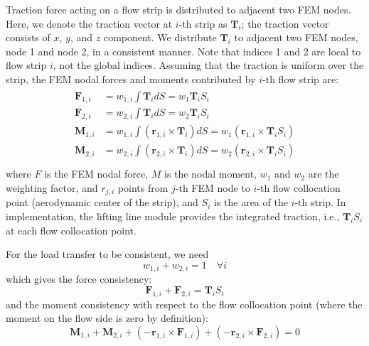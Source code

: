 \documentclass[10pt]{article}
\newcommand{\mb}[1]{\boldsymbol{\mathbf{#1}}} %
\begin{document}
Traction force acting on a flow strip is distributed to adjacent two FEM nodes.
Here, we denote the traction vector at $i$-th strip as $\mb{T}_i$; the traction vector consists of $x$, $y$, and $z$ component.
We distribute $\mb{T}_i$ to adjacent two FEM nodes, node 1 and node 2, in a consistent manner.
Note that indices 1 and 2 are local to flow strip $i$, not the global indices.
Assuming that the traction is uniform over the strip, the FEM nodal forces and moments contributed by $i$-th flow strip are:
\begin{align}
	\begin{aligned}
		\mb{F}_{1,i} & = w_{1,i} \int \mb{T}_i dS = w_1 \mb{T}_i S_i                                                                         \\
		\mb{F}_{2,i} & = w_{2,i} \int\mb{T}_i dS = w_2 \mb{T}_i S_i                                                                          \\
		\mb{M}_{1,i} & = w_{1,i} \int \left( \mb{r}_{1, i} \times \mb{T}_i \right) dS = w_1 \left( \mb{r}_{1, i} \times \mb{T}_i S_i \right) \\
		\mb{M}_{2,i} & = w_{2,i} \int \left( \mb{r}_{2, i} \times \mb{T}_i \right) dS = w_2 \left( \mb{r}_{2, i} \times \mb{T}_i S_i \right) \\
	\end{aligned}
\end{align}
where $F$ is the FEM nodal force, $M$ is the nodal moment, $w_1$ and $w_2$ are the weighting factor, and $r_{j, i}$ points from $j$-th FEM node to $i$-th flow collocation point (aerodynamic center of the strip), and $S_i$ is the area of the $i$-th strip.
In implementation, the lifting line module provides the integrated traction, i.e., $\mb{T}_i S_i$ at each flow collocation point.

For the load transfer to be consistent, we need
\begin{equation}
	w_{1,i} + w_{2,i} = 1 \quad \forall i
\end{equation}
which gives the force consistency:
\begin{equation}
	\mb{F}_{1,i} + \mb{F}_{2,i} = \mb{T}_i S_i
\end{equation}
and the moment consistency with respect to the flow collocation point (where the moment on the flow side is zero by definition):   %
\begin{equation}
	\mb{M}_{1,i} + \mb{M}_{2,i} + (-\mb{r}_{1, i} \times \mb{F}_{1,i}) + (-\mb{r}_{2, i} \times \mb{F}_{2,i}) = 0
\end{equation}
\end{document}
